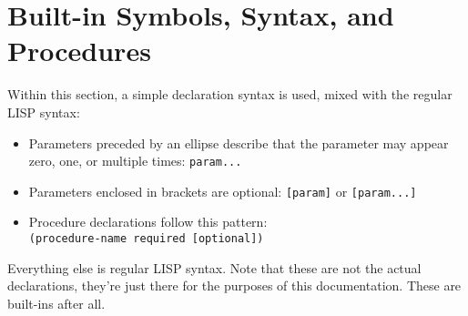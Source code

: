 \documentclass[a4paper]{scrartcl}
\begin{document}


\section{Built-in Symbols, Syntax, and Procedures}
\label{builtins}
	Within this section, a simple declaration syntax is used, mixed with the regular LISP syntax:

	\begin{itemize}
		\item Parameters preceded by an ellipse describe that the parameter may appear zero, one, or multiple times: \lstinline|param...|
		\item Parameters enclosed in brackets are optional: \lstinline|[param]| or \lstinline|[param...]|
		\item Procedure declarations follow this pattern:\\
			  \lstinline|(procedure-name required [optional])|
	\end{itemize}

	Everything else is regular LISP syntax. Note that these are not the actual declarations, they're just there for the purposes of this documentation. These are built-ins after all.

	

	
	
	
	
	
	
	
	

	
	
	
	
	
	
	
	
	
	
	
	
	
	
	
\end{document}
